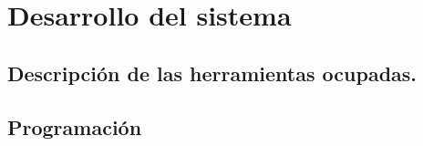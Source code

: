 \section{Desarrollo del sistema}
\subsection{Descripción de las herramientas ocupadas.}


\subsection{Programación}